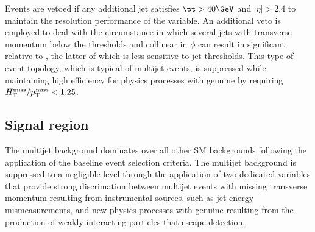 Events are vetoed if any additional jet satisfies $\pt > 40\GeV$ and
$|\eta| > 2.4$ to maintain the resolution performance of the \mht
variable. An additional veto is employed to deal with the circumstance
in which several jets with transverse momentum below the \pt
thresholds and collinear in $\phi$ can result in significant \mht
relative to \ptmiss, the latter of which is less sensitive to jet
thresholds. This type of event topology, which is typical of multijet
events, is suppressed while maintaining high efficiency for physics
processes with genuine \ptvecmiss by requiring $H_{\text{T}}^{\text{miss}} / p_{\text{T}}^{\kern1pt\text{miss}} < 1.25$.


\subsection{Signal region}
\label{sec:signal}

The multijet background dominates over all other SM backgrounds
following the application of the baseline event selection
criteria. The multijet background is suppressed to a negligible level
through the application of two dedicated variables that provide strong
discrimation between multijet events with missing transverse momentum
resulting from instrumental sources, such as jet energy
mismeasurements, and new-physics processes with genuine \ptvecmiss
resulting from the production of weakly interacting particles that
escape detection.

